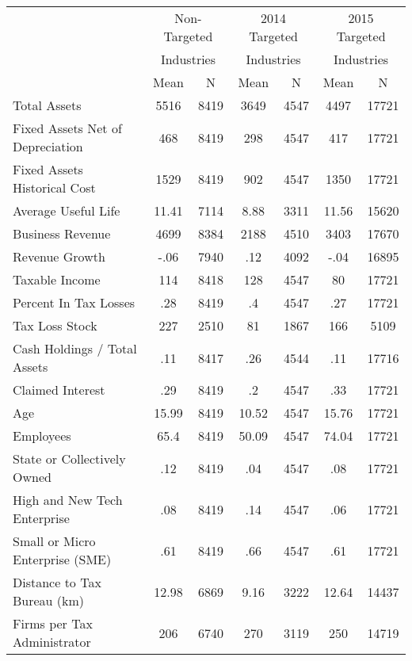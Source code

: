\begin{tabular}{lcccccc} \toprule & \multicolumn{2}{c}{Non-Targeted} & \multicolumn{2}{c}{2014 Targeted} & \multicolumn{2}{c}{2015 Targeted} \\ & \multicolumn{2}{c}{Industries} & \multicolumn{2}{c}{Industries} & \multicolumn{2}{c}{Industries} \\ \midrule
            &        Mean&           N&        Mean&           N&        Mean&           N\\
\midrule
Total Assets&        5516&        8419&        3649&        4547&        4497&       17721\\
Fixed Assets Net of Depreciation&         468&        8419&         298&        4547&         417&       17721\\
Fixed Assets Historical Cost&        1529&        8419&         902&        4547&        1350&       17721\\
Average Useful Life&       11.41&        7114&        8.88&        3311&       11.56&       15620\\
Business Revenue&        4699&        8384&        2188&        4510&        3403&       17670\\
Revenue Growth&        -.06&        7940&         .12&        4092&        -.04&       16895\\
Taxable Income&         114&        8418&         128&        4547&          80&       17721\\
Percent In Tax Losses&         .28&        8419&          .4&        4547&         .27&       17721\\
Tax Loss Stock&         227&        2510&          81&        1867&         166&        5109\\
Cash Holdings / Total Assets&         .11&        8417&         .26&        4544&         .11&       17716\\
Claimed Interest&         .29&        8419&          .2&        4547&         .33&       17721\\
Age         &       15.99&        8419&       10.52&        4547&       15.76&       17721\\
Employees   &        65.4&        8419&       50.09&        4547&       74.04&       17721\\
State or Collectively Owned&         .12&        8419&         .04&        4547&         .08&       17721\\
High and New Tech Enterprise&         .08&        8419&         .14&        4547&         .06&       17721\\
Small or Micro Enterprise (SME)&         .61&        8419&         .66&        4547&         .61&       17721\\
Distance to Tax Bureau (km)&       12.98&        6869&        9.16&        3222&       12.64&       14437\\
 Firms per Tax Administrator&         206&        6740&         270&        3119&         250&       14719\\
\midrule
\bottomrule
\end{tabular}
